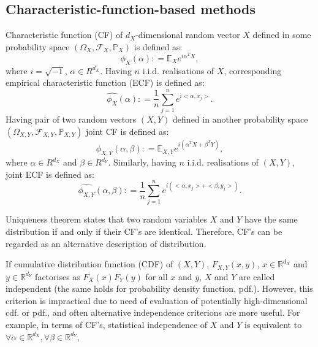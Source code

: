 \documentclass{article}
\begin{document}
\subsection{Characteristic-function-based methods}
\label{section:previous_work_cf}
Characteristic function (CF) of $d_{X}$-dimensional random vector $X$ defined in some probability space $(\Omega_{X}, \mathcal{F}_{X}, \mathbb{P}_{X})$ is defined as: 
\begin{equation}
\label{eq:characteristic_function}
\phi_{X}(\alpha): = \mathbb{E}_{X} e^{i\alpha^{T}X}, 
\end{equation}
where $i=\sqrt{-1}$, $\alpha \in R^{d_{X}}$. Having $n$ i.i.d. realisations of $X$, corresponding empirical characteristic function (ECF) is defined as:
\begin{equation}
\label{eq:ecf}
\widehat{\phi_{X}}(\alpha): = \frac{1}{n} \sum_{j=1}^{n} e^{i <\alpha, x_{j}>}.
\end{equation}
Having pair of two random vectors $(X,Y)$ defined in another probability space $(\Omega_{X,Y}, \mathcal{F}_{X,Y}, \mathbb{P}_{X,Y})$  joint CF is defined as:
\begin{equation}
\label{eq:joint_characteristic_function}
\phi_{X,Y}(\alpha,\beta): = \mathbb{E}_{X,Y} e^{i(\alpha^{T}X + \beta^{T}Y)},
\end{equation}
where $\alpha \in R^{d_{X}}$ and $\beta \in R^{d_{Y}}$. Similarly, having 
$n$ i.i.d. realisations of $(X,Y)$, joint ECF is defined as:
\begin{equation}
\label{eq:joint_ecf}
\widehat{\phi_{X,Y}}(\alpha,\beta): = \frac{1}{n} \sum_{j=1}^{n} e^{i(<\alpha, x_{j}> + <\beta, y_{j}>) }.
\end{equation}


Uniqueness theorem states that two random variables $X$ and $Y$ have the same distribution if and only if their CF's are identical. Therefore,
CF's can be regarded as an alternative description of distribution.


If cumulative distribution function (CDF) of $(X,Y)$, $F_{X,Y}(x,y)$, $x \in \mathbb{R}^{d_{X}}$ and $y \in \mathbb{R}^{d_{Y}}$ factorises as $F_{X}(x)F_{Y}(y)$ for all $x$ and $y$, $X$ and $Y$ are called independent (the same holds for probability density function, pdf.). However, this criterion is impractical due to need of evaluation of potentially high-dimensional cdf. or pdf., and often alternative independence criterions are more useful. For example, in terms of CF's, statistical independence  of $X$ and $Y$ is equivalent to $\forall \alpha \in \mathbb{R}^{d_X},\forall \beta \in \mathbb{R}^{d_Y} $, 
\end{document}
